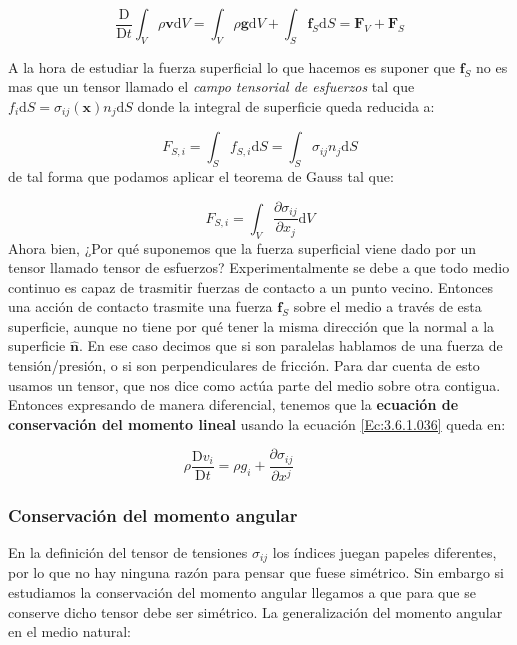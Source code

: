 \documentclass[12pt,a4paper]{article}
\numberwithin{equation}{section}
\numberwithin{figure}{section}
\newcommand{\parciales}[2]{\frac{\partial #1}{\partial #2}}
\newcommand{\D}{\mathrm{d}}
\newcommand{\Dd}{\mathrm{D}}
\newcommand{\tquad}{\quad \quad \quad}
\newcommand{\vn}{\mathbf{v}}
\newcommand{\xn}{\mathbf{x}}
\newcommand{\Fn}{\mathbf{F}}
\newcommand{\gn}{\mathbf{g}}
\newcommand{\fn}{\mathbf{f}}
\newcommand{\hnn}{\hat{\mathbf{n}}}
\begin{document}
\begin{equation}
\dfrac{\Dd}{\Dd t} \int_V \rho \vn \D V = \int_V \rho \gn \D V + \int_S \fn_S \D S = \Fn_V + \Fn_S
\end{equation}


A la hora de estudiar la fuerza superficial lo que hacemos es suponer que $\fn_S$ no es mas que un tensor llamado el \textit{campo tensorial de esfuerzos} tal que $f_i \D S= \sigma_{ij} (\xn) n_j \D S$ donde la integral de superficie queda reducida a:

\begin{equation}
F_{S,i} = \int_S f_{S,i} \D S = \int_S \sigma_{ij} n_j \D S
\end{equation}
de tal forma que podamos aplicar el teorema de Gauss tal que:

\begin{equation}
F_{S,i} = \int_V  \parciales{\sigma_{ij}}{x_j} \D V
\end{equation}
Ahora bien, ¿Por qué suponemos que la fuerza superficial viene dado por un tensor llamado tensor de esfuerzos? Experimentalmente se debe a que todo medio continuo es capaz de trasmitir fuerzas de contacto a un punto vecino. Entonces una acción de contacto trasmite una fuerza $\fn_S$ sobre el medio a través de esta superficie, aunque no tiene por qué tener la misma dirección que la normal a la superficie $\hnn$. En ese caso decimos que si son paralelas hablamos de una fuerza de tensión/presión, o si son perpendiculares de fricción. Para dar cuenta de esto usamos un tensor, que nos dice como actúa parte del medio sobre otra contigua. Entonces expresando de manera diferencial, tenemos que la \textbf{ecuación de conservación del momento lineal} usando la ecuación \ref{Ec:3.6.1.036} queda en:

\begin{equation}
\rho \dfrac{\Dd v_i}{\Dd t} = \rho g_i + \parciales{\sigma_{ij}}{x^j} \tquad 
\end{equation}

\subsubsection{Conservación del momento angular}

En la definición del tensor de tensiones $\sigma_{ij}$ los índices juegan papeles diferentes, por lo que no hay ninguna razón para pensar que fuese simétrico. Sin embargo si estudiamos la conservación del momento angular llegamos a que para que se conserve dicho tensor debe ser simétrico. La generalización del momento angular en el medio natural:
\end{document}
